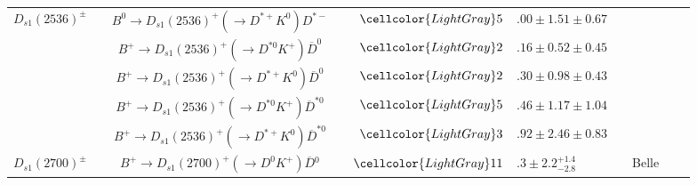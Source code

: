 {\begin{tabular}{cp{5pt}cp{5pt}r@{}lp{5pt}cp{5pt}c}
	\multirow{2}{*}{$D_{s1}(2536)^{\pm}$}	&&	\multirow{1}{*}{$B^{0}\to D_{s1}(2536)^{+}(\to D^{*+}K^{0})D^{*-}$}	&\cellcolor{LightGray} &$	\cellcolor{LightGray} 5$&\cellcolor{LightGray}$.00\pm1.51\pm0.67	$&\cellcolor{LightGray}&	\cellcolor{LightGray} \babar{}	&\cellcolor{LightGray}&	\cite{Aubert:2007rva}         \\ \cmidrule{3-9}
		&&	\multirow{1}{*}{$B^{+}\to D_{s1}(2536)^{+}(\to D^{*0}K^{+})\overline{D}^{0}$}	&\cellcolor{LightGray} &$	\cellcolor{LightGray} 2$&\cellcolor{LightGray}$.16\pm0.52\pm0.45	$&\cellcolor{LightGray}&	\cellcolor{LightGray} \babar{}	&\cellcolor{LightGray}&	\cite{Aubert:2007rva}         \\ \cmidrule{3-9}
		&&	\multirow{1}{*}{$B^{+}\to D_{s1}(2536)^{+}(\to D^{*+}K^{0})\overline{D}^{0}$}	&\cellcolor{LightGray} &$	\cellcolor{LightGray} 2$&\cellcolor{LightGray}$.30\pm0.98\pm0.43	$&\cellcolor{LightGray}&	\cellcolor{LightGray} \babar{}	&\cellcolor{LightGray}&	\cite{Aubert:2007rva}         \\ \cmidrule{3-9}
		&&	\multirow{1}{*}{$B^{+}\to D_{s1}(2536)^{+}(\to D^{*0}K^{+})\overline{D}^{*0}$}	&\cellcolor{LightGray} &$	\cellcolor{LightGray} 5$&\cellcolor{LightGray}$.46\pm1.17\pm1.04	$&\cellcolor{LightGray}&	\cellcolor{LightGray} \babar{}	&\cellcolor{LightGray}&	\cite{Aubert:2007rva}         \\ \cmidrule{3-9}
		&&	\multirow{1}{*}{$B^{+}\to D_{s1}(2536)^{+}(\to D^{*+}K^{0})\overline{D}^{*0}$}	&\cellcolor{LightGray} &$	\cellcolor{LightGray} 3$&\cellcolor{LightGray}$.92\pm2.46\pm0.83	$&\cellcolor{LightGray}&	\cellcolor{LightGray} \babar{}	&\cellcolor{LightGray}&	\cite{Aubert:2007rva}         \\ \midrule
	\multirow{1}{*}{$D_{s1}(2700)^{\pm}$}	&&	\multirow{1}{*}{$B^{+}\to D_{s1}(2700)^{+}(\to D^{0}K^{+})\overline{D}{}^{0}$}	&\cellcolor{LightGray} &$	\cellcolor{LightGray}  11$&\cellcolor{LightGray}$.3\pm2.2{}^{+1.4}_{-2.8}	$&\cellcolor{LightGray}&	\cellcolor{LightGray}  Belle	&\cellcolor{LightGray}&	\cite{Brodzicka:2007aa}       \\ \bottomrule
	\end{tabular}}